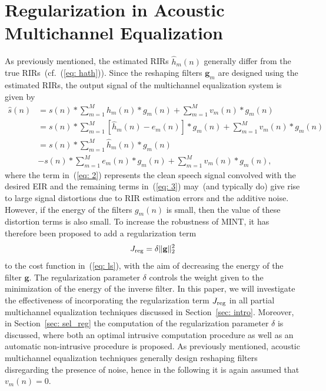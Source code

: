 \documentclass[10pt]{IEEEtran}
\begin{document}
\section{Regularization in Acoustic Multichannel Equalization}
\label{sec: reg}
As previously mentioned, the estimated RIRs $\hat{h}_m(n)$ generally differ from the true RIRs~(cf.~(\ref{eq: hath})).
Since the reshaping filters $\mathbf{g}_m$ are designed using the estimated RIRs, the output signal of the multichannel equalization system is given by
\begin{align}
\hat{s}(n) \!  & = \! s(n) \! \ast \! \! \sum_{m=1}^M \!\! h_m(n) \ast g_m(n) + \sum_{m=1}^M \!\! v_m(n) \ast g_m(n) \\
& = \! s(n) \! \ast \! \! \sum_{m=1}^M \!\!\!\left[\hat{h}_m(n) - e_m(n)\right] \!\!\ast\! g_m(n)\! + \! \sum_{m=1}^M \! \! v_m(n) \ast g_m(n)\!\!  \\ 
\label{eq: 2}
& = s(n) \! \ast \! \sum_{m=1}^M \! \! \hat{h}_m(n) \ast g_m(n) \\
\label{eq: 3}
& - s(n) \! \ast \! \sum_{m=1}^M \!\! e_m(n) \ast g_m(n) \! + \! \sum_{m=1}^M \!\! v_m(n) \ast g_m(n),
\end{align}
where the term in~(\ref{eq: 2}) represents the clean speech signal convolved with the desired EIR and the remaining terms in~(\ref{eq: 3}) may~(and typically do) give rise to large signal distortions due to RIR estimation errors and the additive noise.
However, if the energy of the filters $g_m(n)$ is small, then the value of these distortion terms is also small.
To increase the robustness of MINT, it has therefore been proposed to add a regularization term
\begin{equation}
\label{eq: regterm}
J_{\rm reg} = \delta \|\mathbf{g}\|_2^2
\end{equation}
to the cost function in~(\ref{eq: ls}), with the aim of decreasing the energy of the filter $\mathbf{g}$.
The regularization parameter $\delta$ controls the weight given to the minimization of the energy of the inverse filter.
In this paper, we will investigate the effectiveness of incorporating the regularization term $J_{\rm reg}$ in all partial multichannel equalization techniques discussed in Section~\ref{sec: intro}.
Moreover, in Section~\ref{sec: sel_reg} the computation of the regularization parameter $\delta$ is discussed, where both an optimal intrusive computation procedure as well as an automatic non-intrusive procedure is proposed.
As previously mentioned, acoustic multichannel equalization techniques generally design reshaping filters disregarding the presence of noise, hence in the following it is again assumed that $v_m(n) = 0$.
\end{document}

